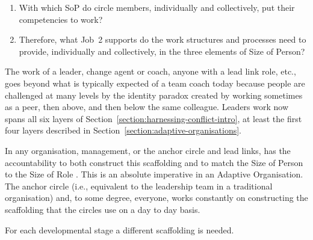 \begin{enumerate}
\item With which SoP do circle members, individually and collectively, put their competencies to work?
\item Therefore, what Job~2 supports do the work structures and processes need to provide, individually and collectively, in the three elements of Size of Person?
\end{enumerate}


The work of a leader, change agent or coach, anyone with a lead link role, etc., goes beyond what is typically expected of a team coach today because people are challenged at many levels by the identity paradox created by working sometimes as a peer, then above, and then below the same colleague. Leaders work now spans all six layers of Section~\ref{section:harnessing-conflict-intro}, at least the first four layers described in Section~\ref{section:adaptive-organisations}. 


In any organisation, management, or the anchor circle and lead links, has the accountability to both construct this scaffolding and to match the Size of Person to the Size of Role . This is an absolute imperative in an Adaptive Organisation. The anchor circle (i.e., equivalent to the leadership team in a traditional organisation) and, to some degree, everyone, works constantly on constructing the scaffolding that the circles use on a day to day basis.


For each developmental stage a different scaffolding  is needed. 


